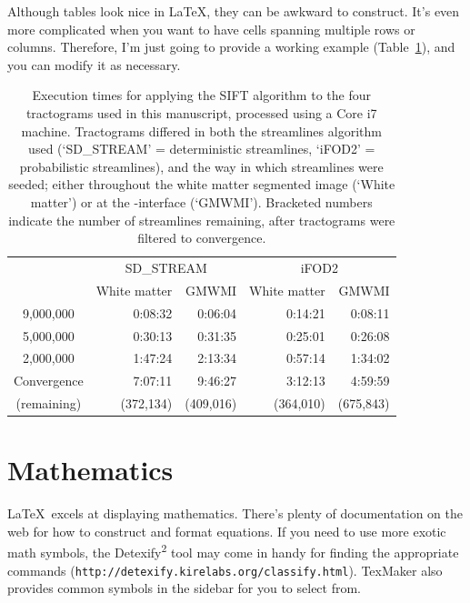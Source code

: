 Although tables look nice in \LaTeX, they can be awkward to construct. It's even more complicated when you want to have cells spanning multiple rows or columns. Therefore, I'm just going to provide a working example (Table~\ref{tab_sift_1}), and you can modify it as necessary.
%
\begin{table}
\centering
\begin{tabular}{c|r|r|r|r|} %
\cline{2-5} %
\multirow{2}{*}{ } & \multicolumn{2}{c|}{SD\_STREAM} & \multicolumn{2}{c|}{iFOD2} \\ 
\cline{2-5}
 & White matter & GMWMI & White matter & GMWMI \\
\hline
\multicolumn{1}{|c|}{9,000,000}   &  0:08:32  &  0:06:04  &  0:14:21  &  0:08:11  \\
\multicolumn{1}{|c|}{5,000,000}   &  0:30:13  &  0:31:35  &  0:25:01  &  0:26:08  \\
\multicolumn{1}{|c|}{2,000,000}   &  1:47:24  &  2:13:34  &  0:57:14  &  1:34:02  \\
\multicolumn{1}{|c|}{Convergence} &  7:07:11  &  9:46:27  &  3:12:13  &  4:59:59  \\
\multicolumn{1}{|c|}{(remaining)} & (372,134) & (409,016) & (364,010) & (675,843) \\
\hline
\end{tabular}
\caption[Execution times for applying the SIFT algorithm]%
{Execution times for applying the SIFT algorithm to the four \invivo tractograms used in this manuscript, processed using a Core i7 machine. Tractograms differed in both the streamlines algorithm used (`SD\_STREAM' = deterministic streamlines, `iFOD2' = probabilistic streamlines), and the way in which streamlines were seeded; either throughout the white matter segmented image (`White matter') or at the \gm-\wm interface (`GMWMI'). Bracketed numbers indicate the number of streamlines remaining, after tractograms were filtered to convergence.}
\label{tab_sift_1}
\end{table}%
%
%
\section{Mathematics}

\LaTeX~excels at displaying mathematics. There's plenty of documentation on the web for how to construct and format equations. If you need to use more exotic math symbols, the Detexify\textsuperscript{2} tool may come in handy for finding the appropriate commands (\verb+http://detexify.kirelabs.org/classify.html+). TexMaker also provides common symbols in the sidebar for you to select from.

